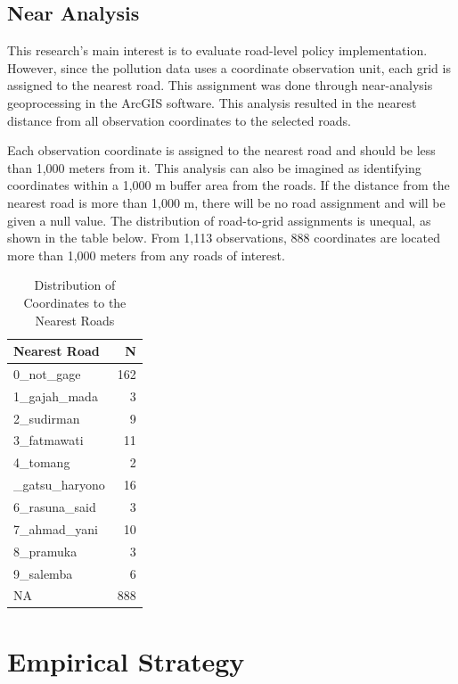 \documentclass[AEJ]{AEA}
\begin{document}
\subsection{Near Analysis}

This research's main interest is to evaluate road-level policy implementation. However, since the pollution data uses a coordinate observation unit, each grid is assigned to the nearest road. This
assignment was done through near-analysis geoprocessing in the ArcGIS software. This analysis resulted in the nearest distance from all observation coordinates to the selected roads.

Each observation coordinate is assigned to the nearest road and should be less than 1,000 meters from it. This analysis can also be imagined as
identifying coordinates within a 1,000 m buffer area from the roads. If the distance from the nearest road is more than 1,000 m, there will be no road assignment and will be given a null value.
The distribution of road-to-grid assignments is unequal, as shown in the table below. From 1,113 observations, 888 coordinates are located more than 1,000 meters from any roads of interest.


\begin{table}

\caption{\label{tab:unnamed-chunk-9}Distribution of Coordinates to the Nearest Roads}
\centering
\small\addtolength{\tabcolsep}{-4pt}
\begin{tabular}[t]{lr}
\toprule
Nearest Road & N\\
\midrule
0\_not\_gage & 162\\
1\_gajah\_mada & 3\\
2\_sudirman & 9\\
3\_fatmawati & 11\\
4\_tomang & 2\\
\addlinespace
5\_gatsu\_haryono & 16\\
6\_rasuna\_said & 3\\
7\_ahmad\_yani & 10\\
8\_pramuka & 3\\
9\_salemba & 6\\
\addlinespace
NA & 888\\
\bottomrule
\end{tabular}
\end{table}

\vspace{-1em}

\section{Empirical Strategy}
\end{document}
